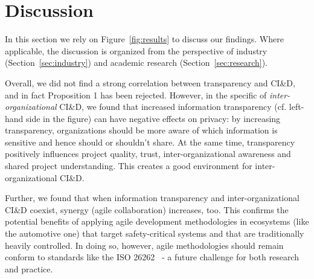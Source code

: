 \section{Discussion}\label{sec:discussion}

In this section we rely on Figure~\ref{fig:results} to discuss our findings. Where applicable, the discussion is organized from the perspective of industry (Section~\ref{sec:industry}) and academic research (Section~\ref{sec:research}).

Overall, we did not find a strong correlation between transparency and CI\&D, and in fact Proposition 1 has been rejected. However, in the specific of {\em inter-organizational} CI\&D, we found that increased information transparency (cf. left-hand side in the figure) %
can have negative effects on privacy: by increasing transparency, organizations should be more aware of which information is sensitive and hence should or shouldn't share.
At the same time, transparency  positively influences project quality, trust, inter-organizational awareness and shared project understanding. This creates a good environment for inter-organizational CI\&D.

Further, we found that when information transparency and inter-organizational CI\&D coexist, synergy (agile collaboration) increases, too. This confirms the potential benefits of applying agile development methodologies in ecosystems (like the automotive one) that target safety-critical systems and that are traditionally heavily controlled. In doing so, however, agile methodologies should remain conform to standards like the ISO 26262~\cite{iso26262} - a future challenge for both research and practice.


